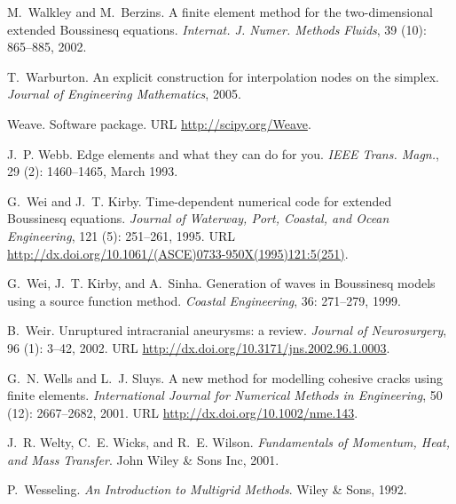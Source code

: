 \begin{thebibliography}{467}
M.~Walkley and M.~Berzins.
\newblock A finite element method for the two-dimensional extended {B}oussinesq
  equations.
\newblock \emph{Internat. J. Numer. Methods Fluids}, 39 (10):
  865--885, 2002.

T.~Warburton.
\newblock An explicit construction for interpolation nodes on the simplex.
\newblock \emph{Journal of Engineering Mathematics}, 2005.

Weave.
\newblock Software package.
\newblock URL \url{http://scipy.org/Weave}.

J.~P. Webb.
\newblock Edge elements and what they can do for you.
\newblock \emph{IEEE Trans. Magn.}, 29 (2): 1460--1465, March
  1993.

G.~Wei and J.~T. Kirby.
\newblock Time-dependent numerical code for extended {B}oussinesq equations.
\newblock \emph{Journal of Waterway, Port, Coastal, and Ocean Engineering},
  121 (5): 251--261, 1995.
\newblock URL \url{http://dx.doi.org/10.1061/(ASCE)0733-950X(1995)121:5(251)}.

G.~Wei, J.~T. Kirby, and A.~Sinha.
\newblock Generation of waves in {B}oussinesq models using a source function
  method.
\newblock \emph{Coastal Engineering}, 36: 271--279, 1999.

B.~Weir.
\newblock Unruptured intracranial aneurysms: a review.
\newblock \emph{Journal of Neurosurgery}, 96 (1): 3--42,
  2002.
\newblock URL \url{http://dx.doi.org/10.3171/jns.2002.96.1.0003}.

G.~N. Wells and L.~J. Sluys.
\newblock A new method for modelling cohesive cracks using finite elements.
\newblock \emph{International Journal for Numerical Methods in Engineering},
  50 (12): 2667--2682, 2001.
\newblock URL \url{http://dx.doi.org/10.1002/nme.143}.

J.~R. Welty, C.~E. Wicks, and R.~E. Wilson.
\newblock \emph{Fundamentals of Momentum, Heat, and Mass Transfer}.
\newblock John Wiley \& Sons Inc, 2001.

P.~Wesseling.
\newblock \emph{An Introduction to Multigrid Methods}.
\newblock Wiley \& Sons, 1992.


\end{thebibliography}
